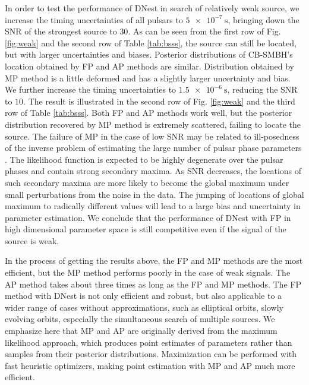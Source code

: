 \documentclass[times,tight]{aastex631}
\begin{document}
In order to test the performance of DNest in search of relatively weak source, we increase the timing uncertainties of all pulsars to $\SI{5e-7}{\second}$, bringing down the SNR of the strongest source to $30$.
As can be seen from the first row of Fig. \ref{fig:weak} and the second row of Table \ref{tab:bsss}, the source can still be located, but with larger uncertainties and biases.
Posterior distributions of CB-SMBH's location obtained by FP and AP methods are similar.
Distribution obtained by MP method is a little deformed and has a slightly larger uncertainty and bias.
We further increase the timing uncertainties to $\SI{1.5e-6}{\second}$, reducing the SNR to $10$.
The result is illustrated in the second row of Fig. \ref{fig:weak} and the third row of Table \ref{tab:bsss}.
Both FP and AP methods work well, but the posterior distribution recovered by MP method is extremely scattered, failing to locate the source.
The failure of MP in the case of low SNR may be related to ill-posedness of the inverse problem of estimating the large number of pulsar phase parameters \citep[e.g.][]{wang2015}.
The likelihood function is expected to be highly degenerate over the pulsar phases and contain strong secondary maxima.
As SNR decreases, the locations of such secondary maxima are more likely to become the global maximum under small perturbations from the noise in the data.
The jumping of locations of global maximum to radically different values will lead to a large bias and uncertainty in parameter estimation.
We conclude that the performance of DNest with FP in high dimensional parameter space is still competitive even if the signal of the source is weak.


In the process of getting the results above, the FP and MP methods are the most efficient, but the MP method performs poorly in the case of weak signals.
The AP method takes about three times as long as the FP and MP methods.
The FP method with DNest is not only efficient and robust, but also applicable to a wider range of cases without approximations, such as elliptical orbits, slowly evolving orbits, especially the simultaneous search of multiple sources. 
We emphasize here that MP and AP are originally derived from the maximum likelihood approach, which produces point estimates of parameters rather than samples from their posterior distributions. 
Maximization can be performed with fast heuristic optimizers, making point estimation with MP and AP much more efficient.
\end{document}
